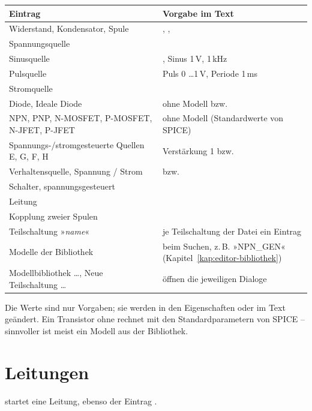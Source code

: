 \begin{center}
\begin{tabularx}{\textwidth}{@{}lL@{}}
  \toprule
  Eintrag & Vorgabe im Text \\
  \midrule
  Widerstand, Kondensator, Spule & , ,  \\
  Spannungsquelle &  \\
  Sinusquelle & , Sinus 1\,V, 1\,kHz \\
  Pulsquelle & Puls 0 \dots 1\,V, Periode 1\,ms \\
  Stromquelle &  \\
  Diode, Ideale Diode & ohne Modell bzw.  \\
  NPN, PNP, N-MOSFET, P-MOSFET, N-JFET, P-JFET & ohne Modell (Standardwerte von SPICE) \\
  Spannungs-/stromgesteuerte Quellen E, G, F, H & Verstärkung 1 bzw.  \\
  Verhaltensquelle, Spannung / Strom &  bzw.  \\
  Schalter, spannungsgesteuert &  \\
  Leitung &  \\
  Kopplung zweier Spulen &  \\
  Teilschaltung »\textit{name}« & je Teilschaltung der Datei ein Eintrag \\
  Modelle der Bibliothek & beim Suchen, z.\,B. »NPN\_GEN« (Kapitel~\ref{kap:editor-bibliothek}) \\
  Modellbibliothek \dots, Neue Teilschaltung \dots & öffnen die jeweiligen Dialoge \\
  \bottomrule
\end{tabularx}
\end{center}

Die Werte sind nur Vorgaben; sie werden in den Eigenschaften oder im Text
geändert. Ein Transistor ohne  rechnet mit den
Standardparametern von SPICE – sinnvoller ist meist ein Modell aus der
Bibliothek.

\section{Leitungen}

 startet eine Leitung, ebenso der Eintrag .

